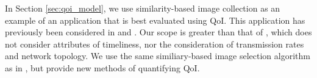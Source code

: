 In Section \ref{sec:qoi_model}, we use similarity-based image collection as an example of an application that is best evaluated using QoI.  This application has previously been considered in \cite{photonet} and \cite{mediascope}. Our scope is greater than that of \cite{photonet}, which does not consider attributes of timeliness, nor the consideration of transmission rates and network topology.  We use the same similiary-based image selection algorithm as in \cite{mediascope}, but provide new methods of quantifying QoI.%
